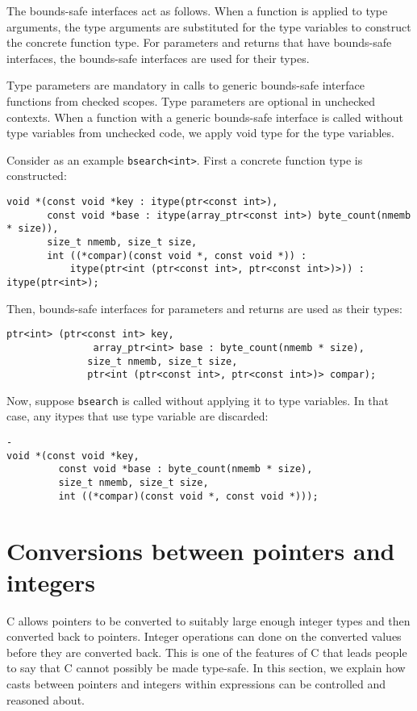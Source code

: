 The bounds-safe interfaces act as follows.  When a function 
is applied to type arguments, the type arguments are substituted
for the type variables to construct the concrete function type.
For parameters and returns that have bounds-safe interfaces, the
bounds-safe interfaces are used for their types.

Type parameters are mandatory in calls
to generic bounds-safe interface functions from checked scopes.
Type parameters are optional in unchecked contexts. When a 
function with a generic bounds-safe interface is called
without type variables from unchecked code, we apply void type
for the type variables.

Consider as an example \lstinline+bsearch<int>+.  First a concrete
function type is constructed:
\begin{lstlisting}
void *(const void *key : itype(ptr<const int>),
       const void *base : itype(array_ptr<const int>) byte_count(nmemb * size)),
       size_t nmemb, size_t size,
       int ((*compar)(const void *, const void *)) :
           itype(ptr<int (ptr<const int>, ptr<const int>)>)) : itype(ptr<int>);
\end{lstlisting}
Then, bounds-safe interfaces for parameters and returns are used as
their types:
\begin{lstlisting}
ptr<int> (ptr<const int> key,
               array_ptr<int> base : byte_count(nmemb * size),
              size_t nmemb, size_t size,
              ptr<int (ptr<const int>, ptr<const int>)> compar);
\end{lstlisting}
Now, suppose \lstinline+bsearch+ is called without applying it to type variables.
In that case, any itypes that use type variable are discarded:
\begin{lstlisting}-
void *(const void *key,
         const void *base : byte_count(nmemb * size),
         size_t nmemb, size_t size,
         int ((*compar)(const void *, const void *)));
\end{lstlisting}

\section{Conversions between pointers and integers}
\label{section:pointer-integer-conversions}

C allows pointers to be converted to suitably large enough integer
types and then converted back to pointers.  Integer operations can
done on the converted values before they are converted back.
This is one of the features of C that leads people to 
say that C cannot possibly be made type-safe.  In this section,
we explain how casts between pointers and integers within 
expressions can be controlled and reasoned about.

